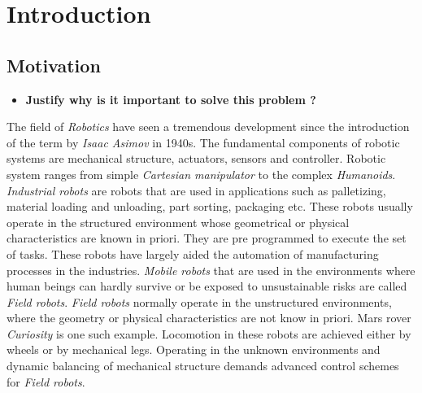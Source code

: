 \chapter{Introduction}
\label{sec:einleitung}

\section{Motivation}
\begin{itemize}
\item \textbf{Justify why is it important to solve this problem ?}
\end{itemize}
The field of \emph{Robotics} have seen a tremendous development since the introduction of the term by \emph{Isaac Asimov} in 1940s. The fundamental components of robotic systems are mechanical structure, actuators, sensors and controller. Robotic system ranges from simple \emph{Cartesian manipulator} to the complex \emph{Humanoids}. \emph{Industrial robots} are robots that are used in applications such as palletizing, material loading and unloading, part sorting, packaging etc. These robots usually operate in the structured environment whose geometrical or physical characteristics are known in priori. They are pre programmed to execute the set of tasks. These robots have largely aided the automation of manufacturing processes in the industries. \emph{Mobile robots} that are used in the environments where human beings can hardly survive or be exposed to unsustainable risks are called \emph{Field robots}. \emph{Field robots} normally operate in the unstructured environments, where the geometry or physical characteristics are not know in priori. Mars rover \emph{Curiosity} is one such example. Locomotion in these robots are achieved either by wheels or by mechanical legs. Operating in the unknown environments and dynamic balancing of mechanical structure demands advanced control schemes for \emph{Field robots}.
